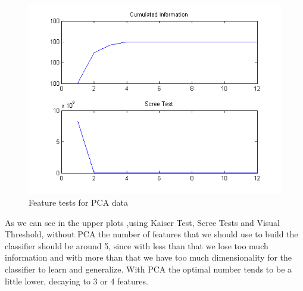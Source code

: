 \documentclass[english, a4paper, 12pt]{article}
\newcommand{\tab}{\hspace*{2em}}
\begin{document}
\begin{figure}[H]
  \centering
  \includegraphics[scale= .8]{pca_features_information.png}
  \caption {Feature tests for PCA data}
\end{figure}
\tab As we can see in the upper plots ,using Kaiser Test, Scree Tests and Visual Threshold, without PCA the number of features that we should use to build the classifier should be around 5, since with less than that we lose too much information and with more than that we have too much dimensionality for the classifier to learn and generalize. With PCA the optimal number tends to be a little lower, decaying to 3 or 4 features. 
\end{document}
